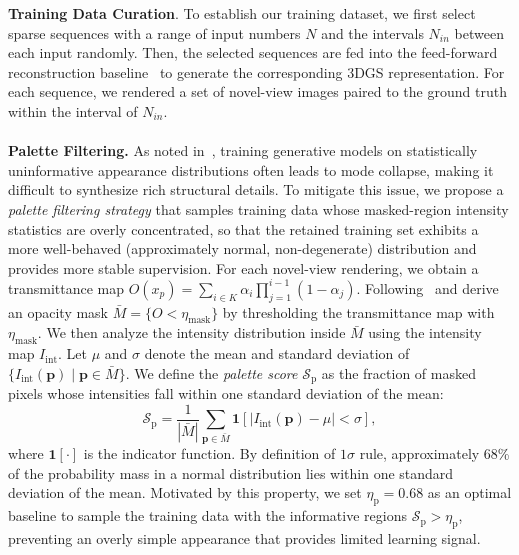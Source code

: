 \noindent\textbf{Training Data Curation}. To establish our training dataset, we first select sparse sequences with a range of input numbers $N$ and the intervals $N_{in}$ between each input randomly. Then, the selected sequences are fed into the feed-forward reconstruction baseline~\cite{jiang2025anysplat} to generate the corresponding 3DGS representation. For each sequence, we rendered a set of novel-view images paired to the ground truth within the interval of $N_{in}$.
\\
\\
\noindent\textbf{Palette Filtering.}
As noted in~\cite{kim2025diffusehigh}, training generative models on statistically uninformative appearance distributions often leads to mode collapse, making it difficult to synthesize rich structural details. To mitigate this issue, we propose a \textit{palette filtering strategy} that samples training data whose masked-region intensity statistics are overly concentrated, so that the retained training set exhibits a more well-behaved (approximately normal, non-degenerate) distribution and provides more stable supervision. For each novel-view rendering, we obtain a transmittance map $O(x_p) = \sum_{i\in K} \alpha_i \prod_{j=1}^{i-1}(1 - \alpha_j)$. Following~\cite{zhong2025taming, zhong2025empowering} and derive an opacity mask $\bar{M} = \{ O < \eta_{\text{mask}} \}$ by thresholding the transmittance map with $\eta_{\text{mask}}$. We then analyze the intensity distribution inside $\bar{M}$ using the intensity map $I_{\text{int}}$.
Let $\mu$ and $\sigma$ denote the mean and standard deviation of $\{I_{\text{int}}(\mathbf{p}) \mid \mathbf{p}\in\bar{M}\}$.
We define the \textit{palette score} $\mathcal{S}_{\text{p}}$ as the fraction of masked pixels whose intensities fall within one standard deviation of the mean:
\begin{equation}
\mathcal{S}_{\text{p}} = \frac{1}{|\bar{M}|} \sum_{\mathbf{p} \in \bar{M}} \mathbf{1} \left[ \big| I_{\text{int}}(\mathbf{p}) - \mu \big| < \sigma \right],
\label{eq:palette_score}
\end{equation}
where $\mathbf{1}[\cdot]$ is the indicator function. By definition of $1\sigma$ rule, approximately 68\% of the probability mass in a normal distribution lies within one standard deviation of the mean. Motivated by this property, we set $\eta_{\text{p}} = 0.68$ as an optimal baseline to sample the training data with the informative regions $\mathcal{S}_{\text{p}} > \eta_{\text{p}}$, preventing an overly simple appearance that provides limited learning signal.
\\
